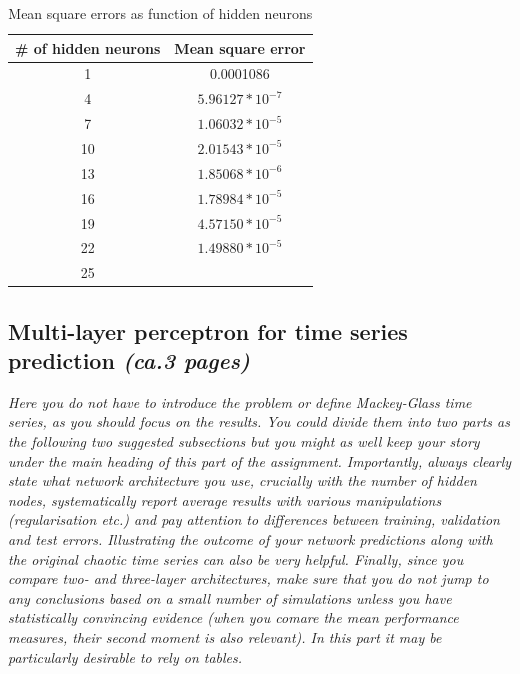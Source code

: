 \documentclass[a4paper]{article}
\begin{document}
\begin{table}
\begin{center}
    \begin{tabular}{|c|c|}
        \hline
         \# of hidden neurons & Mean square error \\
         \hline
         1 & 0.0001086\\
         \hline 
         4 & $5.96127*10^{-7}$\\
         \hline
         7 & $1.06032*10^{-5}$\\
         \hline
         10 & $2.01543*10^{-5}$\\
         \hline
         13 & $1.85068*10^{-6}$\\
         \hline
         16 & $1.78984*10^{-5}$\\
         \hline
         19 & $4.57150*10^{-5}$\\
         \hline
         22 & $1.49880*10^{-5}$\\
         \hline
         25 & $$\\
         \hline
    \end{tabular}
    \caption{Mean square errors as function of hidden neurons}
    \label{table:mse}
    \end{center}
\end{table}




\subsection{Multi-layer perceptron for time series prediction \textit{(ca.3 pages)}}

\textit{Here you do not have to introduce the problem or define Mackey-Glass time series, as you should focus on the results. You could divide them into two parts as the following two suggested subsections but you might as well keep your story under the main heading of this part of the assignment. Importantly, always clearly state what network architecture you use, crucially with the number of hidden nodes, systematically report average results with various manipulations (regularisation etc.) and pay attention to differences between training, validation and test errors. Illustrating the outcome of your network predictions along with the original chaotic time series can also be very helpful. Finally, since you compare two- and three-layer architectures, make sure that you do not jump to any conclusions based on a small number of simulations unless you have statistically convincing evidence (when you comare the mean performance measures, their second moment is also relevant). In this part it may be particularly desirable to rely on tables.}
\end{document}
